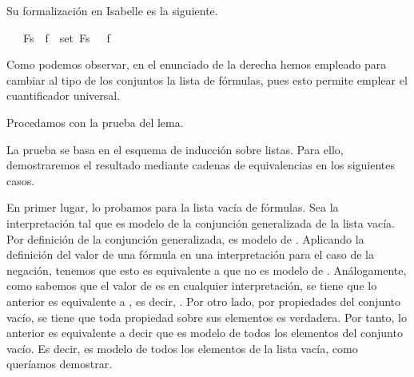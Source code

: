 \begin{isabellebody}
\begin{isamarkuptext}
  Su formalización en Isabelle es la siguiente.%
\end{isamarkuptext}\isamarkuptrue%
\isamarkupfalse%
\ {\isachardoublequoteopen}{\isacharparenleft}{\isasymA}\ {\isasymTurnstile}\ \isactrlbold {\isasymAnd}Fs{\isacharparenright}\ {\isasymlongleftrightarrow}\ {\isacharparenleft}{\isasymforall}f\ {\isasymin}\ set\ Fs{\isachardot}\ {\isasymA}\ {\isasymTurnstile}\ f{\isacharparenright}{\isachardoublequoteclose}\isanewline
%
\isadelimproof
\ \ %
\endisadelimproof
%
\isatagproof
{}\isamarkupfalse%
%
\endisatagproof
{\isafoldproof}%
%
\isadelimproof
%
\endisadelimproof
%
\begin{isamarkuptext}%
Como podemos observar, en el enunciado de la derecha hemos
  empleado  para cambiar al tipo de los conjuntos la lista de 
  fórmulas, pues esto permite emplear el cuantificador universal.

  Procedamos con la prueba del lema.

  \begin{demostracion}
   La prueba se basa en el esquema de inducción sobre listas. Para ello, 
   demostraremos el resultado mediante cadenas de equivalencias en los 
   siguientes casos.

   En primer lugar, lo probamos para la lista vacía de fórmulas. Sea la
   interpretación \isa{{\isasymA}} tal que es modelo de la conjunción generalizada
   de la lista vacía. Por definición de la conjunción generalizada,
   \isa{{\isasymA}} es modelo de \isa{{\isasymnot}\ {\isasymbottom}}. Aplicando la definición del valor de una
   fórmula en una interpretación para el caso de la negación,
   tenemos que esto es equivalente a que \isa{{\isasymA}} no es modelo de \isa{{\isasymbottom}}.
   Análogamente, como sabemos que el valor de \isa{{\isasymbottom}} es  en 
   cualquier interpretación, se tiene que lo anterior es equivalente a
   , es decir, . Por otro lado, por propiedades
   del conjunto vacío, se tiene que toda propiedad sobre sus elementos
   es verdadera. Por tanto, lo anterior es equivalente a decir que \isa{{\isasymA}} 
   es modelo de todos los elementos del conjunto vacío. Es decir, \isa{{\isasymA}}
   es modelo de todos los elementos de la lista vacía, como queríamos
   demostrar. 


\end{demostracion}
\end{isamarkuptext}
\end{isabellebody}

